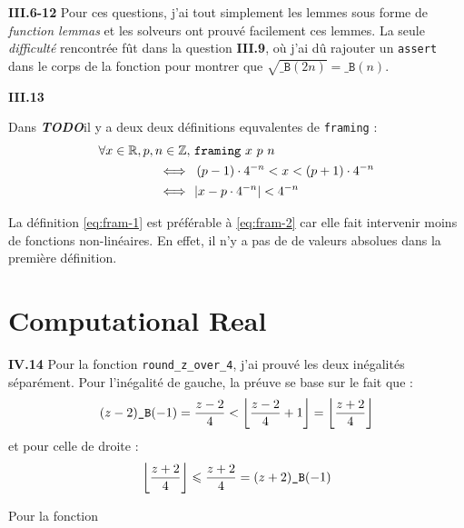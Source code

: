 \documentclass[9pt,a4paper,twocolumn]{article}
\theoremstyle{definition}
\DeclarePairedDelimiter\floor{\lfloor}{\rfloor}
\newcommand{\Z}{\ensuremath\mathbb{Z}}
\newcommand{\R}{\ensuremath\mathbb{R}}
\newcommand{\B}{\texttt{\_B}}
\renewcommand{\leq}{\leqslant}
\newcommand{\TODO}{{\color{red}\textbf{\textit{TODO}}}}
\begin{document}
\textbf{III.6-12} 
Pour ces questions, j'ai tout simplement les lemmes sous forme de
\textit{function lemmas} et les solveurs ont prouvé facilement ces lemmes.
La seule \textit{difficulté} rencontrée fût dans la question \textbf{III.9}, 
où j'ai dû rajouter un \texttt{assert} dans le corps de la fonction pour 
montrer que $\sqrt{\B(2n)} = \B(n)$.

\textbf{III.13}

Dans \TODO il y a deux deux définitions equvalentes de \texttt{framing} : 
\begin{align}
\forall x \in \R, p, n \in \Z,\  \nonumber
	& \texttt{framing}\ x\ p\ n \\ 
\Longleftrightarrow \ \
	& \left( p-1 \right) \cdot 4^{-n} 
		< x <
		\left( p+1 \right) \cdot 4^{-n} 
	\label{eq:fram-1} \\
\Longleftrightarrow \ \
	& |x-p\cdot 4^{-n}| < 4^{-n}
	\label{eq:fram-2}
\end{align}

La définition \ref{eq:fram-1} est préférable à \ref{eq:fram-2} car elle fait
intervenir moins de fonctions non-linéaires.
En effet, il n'y a pas de de valeurs absolues dans la première définition.

\section{Computational Real}

\textbf{IV.14}
Pour la fonction \texttt{round\_z\_over\_4}, j'ai prouvé les deux inégalités
séparément. Pour l'inégalité de gauche, la préuve se  base sur le fait que : 
$$
	(z-2)\B(-1)
	= \frac{z-2}{4} 
	< \floor*{ \frac{z - 2}{4} + 1 }
	= \floor*{ \frac{z+2}{4} }
$$ 
et pour celle de droite : 
$$
\floor*{ \frac{z + 2}{4} }
	\leq \frac{z+2}{4}
	= (z + 2)\B(-1)
$$

Pour la fonction








































\end{document}

